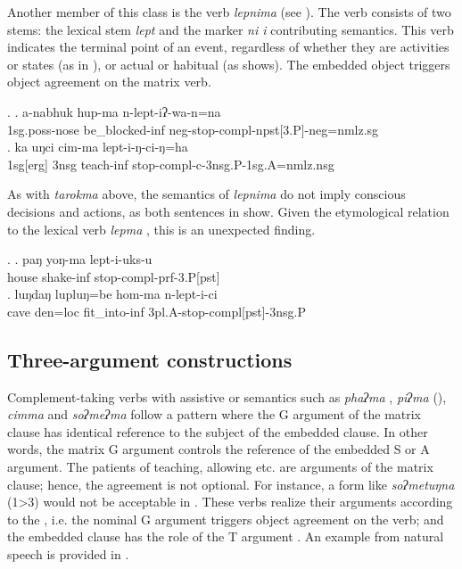 Another member of this class is the  verb \emph{lepnima}   (see \Next). The verb consists of two stems: the lexical stem \emph{lept}  and the marker \emph{ni \ti i} contributing  semantics. This verb indicates the terminal point of an event, regardless of whether  they are activities or states (as in \Next[a]), or actual or habitual (as \Next[b] shows).  The embedded object triggers object agreement on the matrix verb.

\ex. \ag. a-nabhuk hup-ma n-lept-iʔ-wa-n=na\\
{\sc 1sg.poss}-nose be\_blocked{\sc -inf} {\sc neg}-stop{\sc [3sg.A]-compl-npst[3.P]-neg=nmlz.sg}\\
\bg. ka uŋci cim-ma lept-i-ŋ-ci-ŋ=ha\\
{\sc 1sg[erg]} {\sc 3nsg} teach{\sc -inf} stop-{\sc compl-c-3nsg.P-1sg.A=nmlz.nsg}\\

As with \emph{tarokma} above, the semantics of \emph{lepnima} do not imply conscious decisions and actions, as both sentences in \Next show. Given the etymological relation to the lexical verb \emph{lepma} , this is an unexpected finding. 

\ex. \ag. paŋ  yoŋ-ma     lept-i-uks-u\\
house shake{\sc -inf} stop{\sc [3sg.A]-compl-prf-3.P[pst]}\\
 
\bg. luŋdaŋ  lupluŋ=be    hom-ma n-lept-i-ci\\
cave den{\sc =loc} fit\_into-{\sc inf} {\sc 3pl.A-}stop-{\sc compl[pst]-3nsg.P}\\
 



\subsection{Three-argument constructions}	
		
 Complement-taking  verbs with assistive or  semantics such as \emph{phaʔma} , \emph{piʔma}  (), \emph{cimma}  and \emph{soʔmeʔma}  follow a pattern where the G argument of the matrix clause has identical reference to the subject of the embedded clause. In other words, the matrix G argument controls the reference of the embedded S or A argument. The patients of teaching, allowing etc. are arguments of the  matrix clause; hence, the agreement is not optional. For instance, a form like \emph{soʔmetuŋna} (1>3) would not be acceptable in \Next[b]. 
 These verbs realize their arguments according to the , i.e. the nominal G argument triggers object agreement on the verb; and the embedded clause has the role of the T argument \Next. An example from natural speech is provided in \Next[c]. 
 

